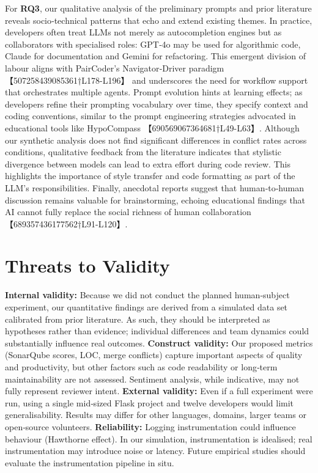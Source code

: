 \documentclass[conference]{IEEEtran}
\begin{document}
For \textbf{RQ3}, our qualitative analysis of the preliminary prompts and prior literature reveals socio‑technical patterns that echo and extend existing themes.  In practice, developers often treat LLMs not merely as autocompletion engines but as collaborators with specialised roles: GPT‑4o may be used for algorithmic code, Claude for documentation and Gemini for refactoring.  This emergent division of labour aligns with PairCoder’s Navigator‑Driver paradigm 【507258439085361†L178-L196】 and underscores the need for workflow support that orchestrates multiple agents.  Prompt evolution hints at learning effects; as developers refine their prompting vocabulary over time, they specify context and coding conventions, similar to the prompt engineering strategies advocated in educational tools like HypoCompass 【690569067364681†L49-L63】.  Although our synthetic analysis does not find significant differences in conflict rates across conditions, qualitative feedback from the literature indicates that stylistic divergence between models can lead to extra effort during code review.  This highlights the importance of style transfer and code formatting as part of the LLM’s responsibilities.  Finally, anecdotal reports suggest that human‑to‑human discussion remains valuable for brainstorming, echoing educational findings that AI cannot fully replace the social richness of human collaboration 【689357436177562†L91-L120】.

\section{Threats to Validity}
\textbf{Internal validity:} Because we did not conduct the planned human‑subject experiment, our quantitative findings are derived from a simulated data set calibrated from prior literature.  As such, they should be interpreted as hypotheses rather than evidence; individual differences and team dynamics could substantially influence real outcomes.  \textbf{Construct validity:} Our proposed metrics (SonarQube scores, LOC, merge conflicts) capture important aspects of quality and productivity, but other factors such as code readability or long‑term maintainability are not assessed.  Sentiment analysis, while indicative, may not fully represent reviewer intent.  \textbf{External validity:} Even if a full experiment were run, using a single mid‑sized Flask project and twelve developers would limit generalisability.  Results may differ for other languages, domains, larger teams or open‑source volunteers.  \textbf{Reliability:} Logging instrumentation could influence behaviour (Hawthorne effect).  In our simulation, instrumentation is idealised; real instrumentation may introduce noise or latency.  Future empirical studies should evaluate the instrumentation pipeline in situ.
\end{document}
